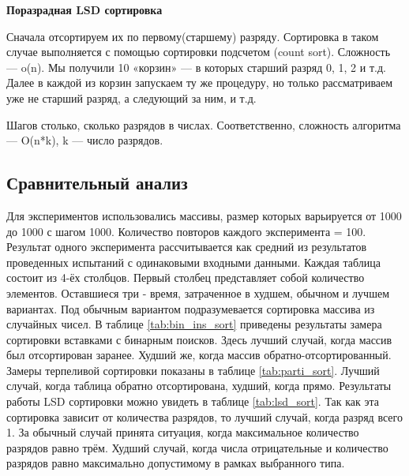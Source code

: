 \documentclass[a4paper, 14pt]{article}
\begin{document}
    \begin{doublespace}
    \large
    \textbf{Поразрадная LSD сортировка}
    \normalsize
    \end{doublespace}
    Сначала отсортируем их по первому(старшему) разряду. Сортировка в таком случае выполняется с помощью сортировки подсчетом (count sort). Сложность — o(n). Мы получили 10 «корзин» — в которых старший разряд 0, 1, 2 и т.д. Далее в каждой из корзин запускаем ту же процедуру, но только рассматриваем уже не старший разряд, а следующий за ним, и т.д.

    Шагов столько, сколько разрядов в числах. Соответственно, сложность алгоритма — O(n*k), k — число разрядов. \cite{habr}

    
    \newpage    
    \subsection{Сравнительный анализ}
    \hspace{1cm}Для экспериментов использовались массивы, размер которых варьируется от 1000 до 1000 с шагом 1000. 
    Количество повторов каждого эксперимента = 100. Результат одного эксперимента рассчитывается как
    средний из результатов проведенных испытаний с одинаковыми входными данными. Каждая таблица состоит из 4-ёх столбцов. Первый столбец представляет собой количество элементов. Оставшиеся три - время, затраченное в худшем, обычном и лучшем вариантах. Под обычным вариантом подразумевается сортировка массива из случайных чисел. 
    В таблице \ref{tab:bin_ins_sort} приведены результаты замера сортировки вставками с бинарным поисков. Здесь лучший случай, когда массив был отсортирован заранее. Худший же, когда массив обратно-отсортированный. Замеры терпеливой сортировки показаны в таблице \ref{tab:parti_sort}. Лучший случай, когда таблица обратно отсортирована, худший, когда прямо. Результаты работы LSD сортировки можно увидеть в таблице \ref{tab:lsd_sort}. Так как эта сортировка зависит от количества разрядов, то лучший случай, когда разряд всего 1. За обычный случай принята ситуация, когда максимальное количество разрядов равно трём. Худший случай, когда числа отрицательные и количество разрядов равно максимально допустимому в рамках выбранного типа. 
     
\end{document}
